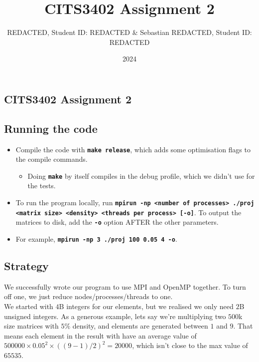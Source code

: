 \documentclass[11pt,leqno]{article}
\title{CITS3402 Assignment 2}
\author{REDACTED, Student ID: REDACTED \& Sebastian REDACTED, Student ID: REDACTED}
\date{2024}
\providecommand{\tightlist}{%
  \setlength{\itemsep}{0pt}\setlength{\parskip}{0pt}}
\begin{document}
\maketitle
\begin{flushleft}


\section{CITS3402 Assignment 2}\label{cits3402-assignment-2}

\subsection{Running the code}\label{running-the-code}

\begin{itemize}[label=\textcolor{CtpMauve}{\textbullet}]
\tightlist
\item
  Compile the code with \textbf{\texttt{make release}}, which
  adds some optimisation flags to the compile commands.

  \begin{itemize}[label=\textcolor{CtpTeal}{$-$}]
  \tightlist
  \item
    Doing \textbf{\texttt{make}} by itself compiles in the debug
    profile, which we didn't use for the tests.
  \end{itemize}
\item
  To run the program locally, run
  \textbf{\texttt{mpirun -np <number of processes> ./proj <matrix size> <density> <threads per process> [-o]}}.
  To output the matrices to disk, add the \textbf{\texttt{-o}} option AFTER the other parameters.
\item
  For example, \textbf{\texttt{mpirun -np 3 ./proj 100 0.05 4 -o}}.
\end{itemize}

\subsection{Strategy}\label{strategy}
\RaggedRight
We successfully wrote our program to use MPI and OpenMP together. To
turn off one, we just reduce nodes/processes/threads to one.  \\[2 ex]

We started with $4$B integers for our elements, but we realised we only
need $2$B unsigned integers. As a generous example, lets say we're
multiplying two $500$k size matrices with $5\%$ density, and elements are
generated between $1$ and $9$. That means each element in the result with
have an average value of
$500000 \times 0.05 ^ 2 \times ((9 - 1) / 2) ^ 2 = 20000$,
which isn't close to the max value of $65535$.


\end{flushleft}
\end{document}
